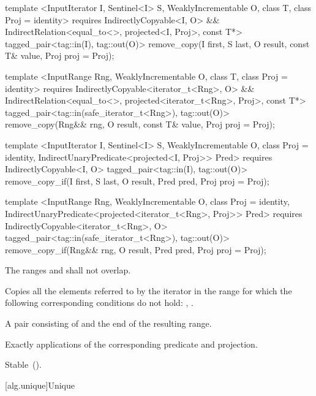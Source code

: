 %
%
\begin{itemdecl}
template <InputIterator I, Sentinel<I> S, WeaklyIncrementable O, class T,
    class Proj = identity>
  requires IndirectlyCopyable<I, O> &&
    IndirectRelation<equal_to<>, projected<I, Proj>, const T*>
  tagged_pair<tag::in(I), tag::out(O)>
    remove_copy(I first, S last, O result, const T& value, Proj proj = Proj{});

template <InputRange Rng, WeaklyIncrementable O, class T, class Proj = identity>
  requires IndirectlyCopyable<iterator_t<Rng>, O> &&
    IndirectRelation<equal_to<>, projected<iterator_t<Rng>, Proj>, const T*>
  tagged_pair<tag::in(safe_iterator_t<Rng>), tag::out(O)>
    remove_copy(Rng&& rng, O result, const T& value, Proj proj = Proj{});

template <InputIterator I, Sentinel<I> S, WeaklyIncrementable O,
    class Proj = identity, IndirectUnaryPredicate<projected<I, Proj>> Pred>
  requires IndirectlyCopyable<I, O>
  tagged_pair<tag::in(I), tag::out(O)>
    remove_copy_if(I first, S last, O result, Pred pred, Proj proj = Proj{});

template <InputRange Rng, WeaklyIncrementable O, class Proj = identity,
    IndirectUnaryPredicate<projected<iterator_t<Rng>, Proj>> Pred>
  requires IndirectlyCopyable<iterator_t<Rng>, O>
  tagged_pair<tag::in(safe_iterator_t<Rng>), tag::out(O)>
    remove_copy_if(Rng&& rng, O result, Pred pred, Proj proj = Proj{});
\end{itemdecl}

\begin{itemdescr}
\pnum
\requires
The ranges
and
shall not overlap.

\pnum
\effects
Copies all the elements referred to by the iterator
in the range
for which the following corresponding conditions do not hold:
,
.

\pnum
\returns
A pair consisting of  and the end of the resulting range.

\pnum
\complexity
Exactly
applications of the corresponding predicate and projection.

\pnum
\remarks Stable~().
\end{itemdescr}

[alg.unique]{Unique}

